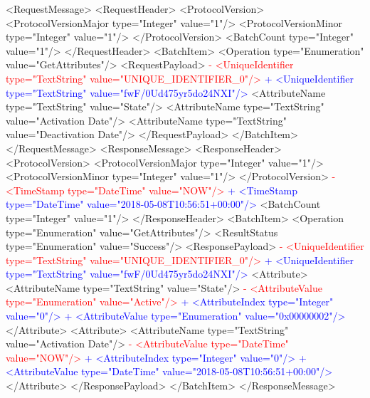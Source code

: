  \newpage
 <RequestMessage>
   <RequestHeader>
     <ProtocolVersion>
       <ProtocolVersionMajor type="Integer" value="1"/>
       <ProtocolVersionMinor type="Integer" value="1"/>
     </ProtocolVersion>
     <BatchCount type="Integer" value="1"/>
   </RequestHeader>
   <BatchItem>
     <Operation type="Enumeration" value="GetAttributes"/>
     <RequestPayload>
\textcolor{red}{-      <UniqueIdentifier type="TextString" value="UNIQUE_IDENTIFIER_0"/>}
\textcolor{blue}{+      <UniqueIdentifier type="TextString" value="fwF/0Ud475yr5do24NXI"/>}
       <AttributeName type="TextString" value="State"/>
       <AttributeName type="TextString" value="Activation Date"/>
       <AttributeName type="TextString" value="Deactivation Date"/>
     </RequestPayload>
   </BatchItem>
 </RequestMessage>
 <ResponseMessage>
   <ResponseHeader>
     <ProtocolVersion>
       <ProtocolVersionMajor type="Integer" value="1"/>
       <ProtocolVersionMinor type="Integer" value="1"/>
     </ProtocolVersion>
\textcolor{red}{-    <TimeStamp type="DateTime" value="NOW"/>}
\textcolor{blue}{+    <TimeStamp type="DateTime" value="2018-05-08T10:56:51+00:00"/>}
     <BatchCount type="Integer" value="1"/>
   </ResponseHeader>
   <BatchItem>
     <Operation type="Enumeration" value="GetAttributes"/>
     <ResultStatus type="Enumeration" value="Success"/>
     <ResponsePayload>
\textcolor{red}{-      <UniqueIdentifier type="TextString" value="UNIQUE_IDENTIFIER_0"/>}
\textcolor{blue}{+      <UniqueIdentifier type="TextString" value="fwF/0Ud475yr5do24NXI"/>}
       <Attribute>
         <AttributeName type="TextString" value="State"/>
\textcolor{red}{-        <AttributeValue type="Enumeration" value="Active"/>}
\textcolor{blue}{+        <AttributeIndex type="Integer" value="0"/>}
\textcolor{blue}{+        <AttributeValue type="Enumeration" value="0x00000002"/>}
       </Attribute>
       <Attribute>
         <AttributeName type="TextString" value="Activation Date"/>
\textcolor{red}{-        <AttributeValue type="DateTime" value="NOW"/>}
\textcolor{blue}{+        <AttributeIndex type="Integer" value="0"/>}
\textcolor{blue}{+        <AttributeValue type="DateTime" value="2018-05-08T10:56:51+00:00"/>}
       </Attribute>
     </ResponsePayload>
   </BatchItem>
 </ResponseMessage>
 
